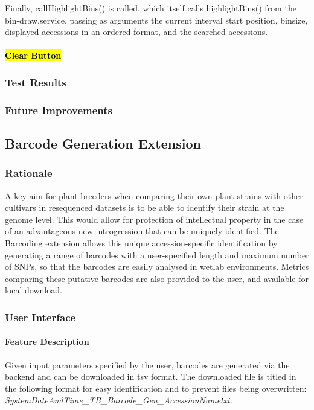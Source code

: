 \documentclass[12pt]{article}
\begin{document}
Finally, callHighlightBins() is called, which itself calls highlightBins() from the bin-draw.service, passing as arguments the current interval start position, binsize, displayed accessions in an ordered format, and the searched accessions.  
\paragraph{\hl{Clear Button }}
 

\subsubsection{Test Results}
\subsubsection{Future Improvements}


\subsection{Barcode Generation Extension}
\subsubsection{Rationale}
A key aim for plant breeders when comparing their own plant strains with other cultivars in resequenced datasets is to be able to identify their strain at the genome level. 
This would allow for protection of intellectual property in the case of an advantageous new introgression that can be uniquely identified. 
The Barcoding extension allows this unique accession-specific identification by generating a range of barcodes with a user-specified length and maximum number of SNPs,
so that the barcodes are easily analysed in wetlab environments. Metrics comparing these putative barcodes are also provided to the user, and available for local download. 

\subsubsection{User Interface}
\paragraph{Feature Description}
Given input parameters specified by the user, barcodes are generated via the backend and can be downloaded in tsv format. The downloaded file is titled in the following format for easy identification and to prevent files being overwritten: \textit{SystemDateAndTime\_TB\_Barcode\_Gen\_AccessionName\.txt}.
\end{document}
